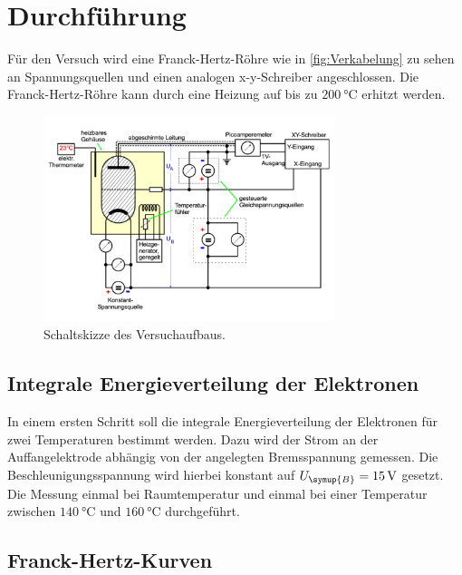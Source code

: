\section{Durchführung}
\label{sec:Durchführung}
Für den Versuch wird eine Franck-Hertz-Röhre wie in \autoref{fig:Verkabelung} zu sehen an Spannungsquellen und einen analogen 
x-y-Schreiber angeschlossen. Die Franck-Hertz-Röhre kann durch eine Heizung auf bis zu $\qty{200}{\celsius}$ erhitzt werden.
\begin{figure}[H]
    \centering
    \includegraphics[height=6cm]{content/pics/Verkabelung.pdf}
    \caption{Schaltskizze des Versuchaufbaus.\cite{v601}}
    \label{fig:Verkabelung}
\end{figure}

\subsection{Integrale Energieverteilung der Elektronen}
\label{sec:Engergieverteilung Elektronen}
In einem ersten Schritt soll die integrale Energieverteilung der Elektronen für zwei Temperaturen bestimmt werden. Dazu wird der Strom 
an der Auffangelektrode abhängig von der angelegten Bremsspannung gemessen. Die Beschleunigungsspannung wird hierbei konstant auf 
$U_{\symup{B}}=\qty{15}{\volt}$ gesetzt. Die Messung einmal bei Raumtemperatur und einmal bei einer Temperatur zwischen 
$\qty{140}{\celsius}$ und $\qty{160}{\celsius}$ durchgeführt.

\subsection{Franck-Hertz-Kurven}
\label{sec:Franck-Hertz-Kurven}
